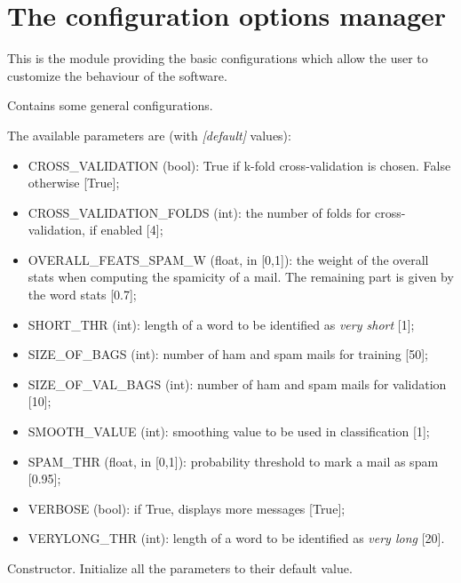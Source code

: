 \documentclass[letterpaper,10pt,english]{sphinxmanual}
\begin{document}
\section{The configuration options manager}
\label{index:the-configuration-options-manager}
This is the module providing the basic configurations which allow the user to customize the behaviour of the software.
\label{index:module-config}

\begin{fulllineitems}
\label{index:config.Config}
Contains some general configurations.

The available parameters are (with \emph{{[}default{]}} values):
\begin{itemize}
\item {} 
CROSS\_VALIDATION (bool): True if k-fold cross-validation is chosen.        False otherwise {[}True{]};

\item {} 
CROSS\_VALIDATION\_FOLDS (int): the number of folds for        cross-validation, if enabled {[}4{]};

\item {} 
OVERALL\_FEATS\_SPAM\_W (float, in {[}0,1{]}): the weight of the overall stats        when computing the spamicity of a mail. The remaining part is given by        the word stats {[}0.7{]};

\item {} 
SHORT\_THR (int): length of a word to be identified as \emph{very short} {[}1{]};

\item {} 
SIZE\_OF\_BAGS (int): number of ham and spam mails for training {[}50{]};

\item {} 
SIZE\_OF\_VAL\_BAGS (int): number of ham and spam mails for validation {[}10{]};

\item {} 
SMOOTH\_VALUE (int): smoothing value to be used in classification {[}1{]};

\item {} 
SPAM\_THR (float, in {[}0,1{]}): probability threshold to mark a mail as spam {[}0.95{]};

\item {} 
VERBOSE (bool): if True, displays more messages {[}True{]};

\item {} 
VERYLONG\_THR (int): length of a word to be identified as \emph{very long} {[}20{]}.

\end{itemize}

\begin{fulllineitems}
\label{index:config.Config.__init__}
Constructor. Initialize all the parameters to their default value.

\end{fulllineitems}


\end{fulllineitems}
\end{document}
